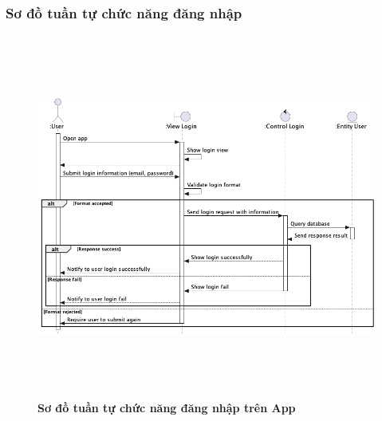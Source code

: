 \documentclass{article}%
\begin{document}
\subsubsection{Sơ đồ tuần tự chức năng đăng nhập}
    \begin{figure}[H]
         \centering
         \includegraphics[width=16cm,height=12cm]{Images/mobile_app/login.png}
         \caption[Sơ đồ tuần tự chức năng đăng nhập trên App]{\bfseries \fontsize{12pt}{0pt}
         \selectfont Sơ đồ tuần tự chức năng đăng nhập trên App}
         \label{hinh21} %
    \end{figure}
\end{document}
